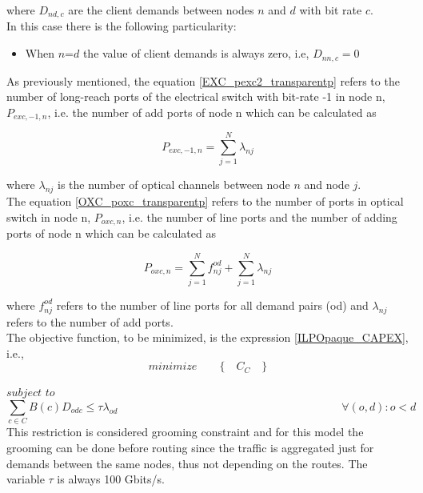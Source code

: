 \vspace{11pt}
\noindent
where $D_{nd,c}$ are the client demands between nodes $n$ and $d$ with bit rate $c$.\\

In this case there is the following particularity:

\begin{itemize}
  \item When $n$=$d$ the value of client demands is always zero, i.e, $D_{nn,c}=0$
\end{itemize}

\vspace{11pt}
As previously mentioned, the equation \ref{EXC_pexc2_transparentp} refers to the number of long-reach ports of the electrical switch with bit-rate -1 in node n, $P_{exc,-1,n}$, i.e. the number of add ports of node n which can be calculated as

\begin{equation}
P_{exc,-1,n} = \sum_{j=1}^{N} \lambda_{nj}
\label{EXC_pexc2_transparentp}
\end{equation}

\vspace{11pt}
\noindent
where $\lambda_{nj}$ is the number of optical channels between node $n$ and node $j$.\\

The equation \ref{OXC_poxc_transparentp} refers to the number of ports in optical switch in node n, $P_{oxc,n}$, i.e. the number of line ports and the number of adding ports of node n which can be calculated as

\begin{equation}
P_{oxc,n} = \sum_{j=1}^{N} f_{nj}^{od} + \sum_{j=1}^{N} \lambda_{nj}
\label{OXC_poxc_transparentp}
\end{equation}

\vspace{11pt}
\noindent
where $f_{nj}^{od}$ refers to the number of line ports for all demand pairs (od) and $\lambda_{nj}$ refers to the number of add ports.\\

The objective function, to be minimized, is the expression \ref{ILPOpaque_CAPEX}, i.e.,
\begin{equation*}
  minimize \qquad \Big\{ \quad C_C \quad \Big\}
\end{equation*}

$subject$ $to$
\begin{equation}
\sum_{c\in C} B\left(c\right) D_{odc} \leq \tau \lambda_{od} \qquad \qquad \qquad \qquad \qquad \qquad \qquad \qquad \qquad \qquad
\forall(o,d) : o < d
\label{ILPTransp0}
\end{equation}
\noindent
This restriction is considered grooming constraint and for this model the grooming can be done before routing since the traffic is aggregated just for demands between the same nodes, thus not depending on the routes. The variable  $\tau$ is always 100 Gbits/s.

